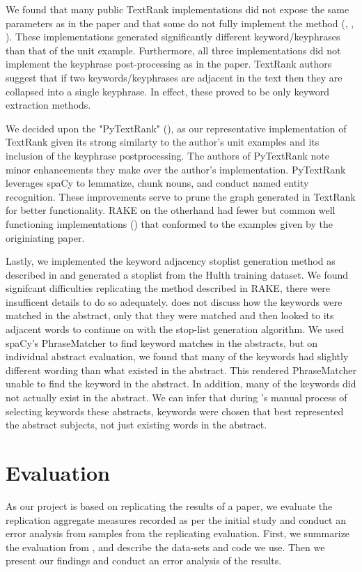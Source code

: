 \documentclass[11pt,a4paper]{article}
\begin{document}
We found that many public TextRank implementations did not expose the same parameters as in the paper and that some do not fully implement the method (\citet{TextRank-alt1}, \citet{TextRank-alt2}, \citet{TextRank-alt3}). These implementations generated significantly different keyword/keyphrases than that of the unit example. Furthermore, all three implementations did not implement the keyphrase post-processing as in the paper. TextRank authors suggest that if two keywords/keyphrases are adjacent in the text then they are collapsed into a single keyphrase. In effect, these proved to be only keyword extraction methods. 

We decided upon the "PyTextRank" (\citet{PyTextRank}), as our representative implementation of TextRank given its strong similarty to the author's unit examples and its inclusion of the keyphrase postprocessing. The authors of PyTextRank note minor enhancements they make over the author's implementation. PyTextRank leverages spaCy to lemmatize, chunk nouns, and conduct named entity recognition. These improvements serve to prune the graph generated in TextRank for better functionality. RAKE on the otherhand had fewer but common well functioning implementations (\citet{2}) that conformed to the examples given by the originiating paper. 

Lastly, we implemented the keyword adjacency stoplist generation method as described in \citet{1} and generated a stoplist from the Hulth training dataset. We found signifcant difficulties replicating the method described in RAKE, there were insufficent details to do so adequately. \citet{1} does not discuss how the keywords were matched in the abstract, only that they were matched and then looked to its adjacent words to continue on with the stop-list generation algorithm. We used spaCy's PhraseMatcher to find keyword matches in the abstracts, but on individual abstract evaluation, we found that many of the keywords had slightly different wording than what existed in the abstract. This rendered PhraseMatcher unable to find the keyword in the abstract. In addition, many of the keywords did not actually exist in the abstract. We can infer that during \citet{hulth-2003-improved}'s manual process of selecting keywords these abstracts, keywords were chosen that best represented the abstract subjects, not just existing words in the abstract.


\section{Evaluation}
As our project is based on replicating the results of a paper, we evaluate the replication aggregate measures recorded as per the initial study and conduct an error analysis from samples from the replicating evaluation. First, we summarize the evaluation from , and describe the data-sets and code we use. Then we present our findings and conduct an error analysis of the results. 
\end{document}
